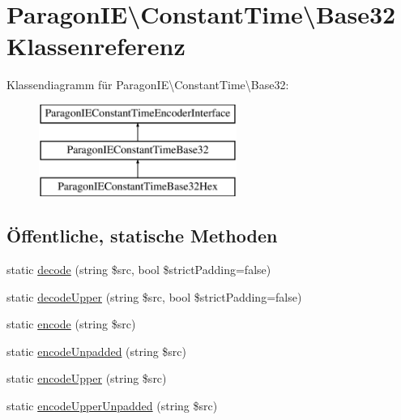 \hypertarget{class_paragon_i_e_1_1_constant_time_1_1_base32}{}\section{Paragon\+IE\textbackslash{}Constant\+Time\textbackslash{}Base32 Klassenreferenz}
\label{class_paragon_i_e_1_1_constant_time_1_1_base32}
Klassendiagramm für Paragon\+IE\textbackslash{}Constant\+Time\textbackslash{}Base32\+:\begin{figure}[H]
\begin{center}
\leavevmode
\includegraphics[height=3.000000cm]{class_paragon_i_e_1_1_constant_time_1_1_base32}
\end{center}
\end{figure}
\subsection*{Öffentliche, statische Methoden}
\begin{DoxyCompactItemize}
\item 
static \mbox{\hyperlink{class_paragon_i_e_1_1_constant_time_1_1_base32_af563051c30335628aff64b65b035ae3f}{decode}} (string \$src, bool \$strict\+Padding=false)
\item 
static \mbox{\hyperlink{class_paragon_i_e_1_1_constant_time_1_1_base32_afc291be096a3ad6bff476416daacedfa}{decode\+Upper}} (string \$src, bool \$strict\+Padding=false)
\item 
static \mbox{\hyperlink{class_paragon_i_e_1_1_constant_time_1_1_base32_af1ba6da288e869c1e1add91f3301a702}{encode}} (string \$src)
\item 
static \mbox{\hyperlink{class_paragon_i_e_1_1_constant_time_1_1_base32_a9a1fc843fe2ba88d15dd1839751a551d}{encode\+Unpadded}} (string \$src)
\item 
static \mbox{\hyperlink{class_paragon_i_e_1_1_constant_time_1_1_base32_a80ad7226938f9bf180633489ad5b97b3}{encode\+Upper}} (string \$src)
\item 
static \mbox{\hyperlink{class_paragon_i_e_1_1_constant_time_1_1_base32_ade34e06da009cc022f1fcc26e4953fe4}{encode\+Upper\+Unpadded}} (string \$src)
\end{DoxyCompactItemize}
